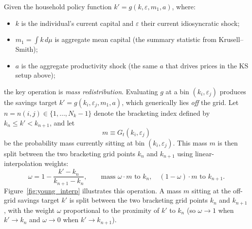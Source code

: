 \documentclass[11pt,a4paper]{report}
\begin{document}
Given the household policy function $k' = g(k, \varepsilon, m_1, a)$, where:
\begin{itemize}[itemsep=1pt, leftmargin=*]
\item $k$ is the individual's current capital and $\varepsilon$ their current idiosyncratic shock;
\item $m_1 = \int k\,d\mu$ is aggregate mean capital (the summary statistic from Krusell--Smith);
\item $a$ is the aggregate productivity shock (the same $a$ that drives prices in the KS setup above);
\end{itemize}
the key operation is \emph{mass redistribution}.  Evaluating $g$ at a bin $(k_i,\varepsilon_j)$ produces the savings target $k' = g(k_i, \varepsilon_j, m_1, a)$, which generically lies \emph{off} the grid.  Let $n = n(i,j) \in \{1,\ldots,N_k-1\}$ denote the bracketing index defined by $k_n \leq k' < k_{n+1}$, and let
\[ m \equiv G_t(k_i,\varepsilon_j) \]
be the probability mass currently sitting at bin $(k_i,\varepsilon_j)$.  This mass $m$ is then split between the two bracketing grid points $k_n$ and $k_{n+1}$ using linear-interpolation weights:
\begin{equation}
\omega = 1 - \frac{k' - k_n}{k_{n+1} - k_n}, \qquad
\text{mass } \omega\cdot m \text{ to } k_n, \quad (1-\omega)\cdot m \text{ to } k_{n+1}.
\label{eq:young_weights}
\end{equation}
%
Figure~\ref{fig:young_interp} illustrates this operation.  A mass $m$ sitting at the off-grid savings target $k'$ is split between the two bracketing grid points $k_n$ and $k_{n+1}$, with the weight $\omega$ proportional to the proximity of $k'$ to $k_n$ (so $\omega \to 1$ when $k' \to k_n$ and $\omega \to 0$ when $k' \to k_{n+1}$).
\end{document}
